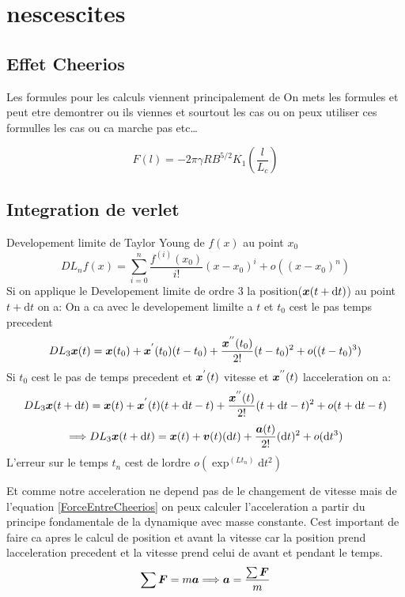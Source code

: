 \documentclass[a4paper, 11pt, oneside]{article} %
\newcommand{\dd}[1]{\mathrm{d}#1}
\begin{document}
    \section{nescescites}
    \subsection{Effet Cheerios}
    Les formules pour les calculs viennent principalement de \cite{cheerios_2005} 
    On mets les formules et peut etre demontrer ou ils viennes et sourtout les cas ou on peux utiliser ces formulles les cas ou ca marche pas etc\ldots

    \begin{equation}
        \label{ForceEntreCheerios}
        F(l) = -2\pi \gamma R B^{5/2} K_1 \left( \frac{l}{L_c}\right)
    \end{equation}
    \subsection{Integration de verlet}
    Developement limite de Taylor Young de $f(x)$ au point $x_0$%
    \begin{equation}
        DL_n f(x) = \sum_{i=0}^{n}\frac{f^{(i)}(x_0)}{i!}(x-x_0)^i+ o((x-x_0)^n)
    \end{equation}
    Si on applique le Developement limite de ordre 3 la position($\vb*{x}(t+\dd t)$) au point $t+\dd t$ on a:
    On a ca avec le developement limilte a $t$ et $t_0$ cest le pas temps precedent
    \[DL_3 \vb*{x}(t) = \vb*{x}(t_0)+\vb*{x}^{'}(t_0)(t-t_0)+\frac{\vb*{x}^{''}(t_0)}{2!}(t-t_0)^2 +o((t-t_0)^3)\]
    Si $t_0$ cest le pas de temps precedent et $\vb*{x}^{'}(t)$ vitesse et $\vb*{x}^{''}(t)$ lacceleration on a:
        \[DL_3 \vb*{x}(t+\dd t) = \vb*{x}(t)+\vb*{x}^{'}(t)(t+\dd t-t)+\frac{\vb*{x}^{''}(t)}{2!}(t+\dd t-t)^2+o(t+\dd t-t)\]
        \[\Longrightarrow DL_3 \vb*{x}(t+\dd t)= \vb*{x}(t)+\vb*{v}(t)(\dd t)+\frac{\vb*{a}(t)}{2!}(\dd t)^2+o(\dd t^3)\]
    L'erreur sur le temps $t_n$ cest de lordre $o(\exp^(Lt_n)\dd t^2)$ %
    
    Et comme notre acceleration ne depend pas de le changement de vitesse mais de l'equation \ref{ForceEntreCheerios} on peux calculer l'acceleration a partir du principe fondamentale de la dynamique avec masse constante. Cest important de faire ca apres le calcul de position et avant la vitesse car la position prend lacceleration precedent et la vitesse prend celui de avant et pendant le temps.
    \begin{equation}
        \label{PFD}
        \sum  \vb*{F} = m\vb*{a} \Longrightarrow \vb*{a} = \frac{\sum \vb*{F}}{m}
    \end{equation}
\end{document}

